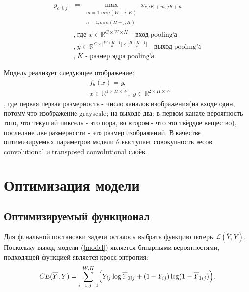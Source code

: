 \documentclass[14pt, a4paper, oneside, bold]{extarticle}
\begin{document}
\begin{equation} \label{pooling}
\begin{aligned}
	y_{c, i, j} & = \max \limits_{
		\substack{
			m=\overline{1, min(W - i, K)}
			\\ n=\overline{1, min(H - j, K)}}}
		x_{c, i K + m, j K + n} \\
	& \text{, где $x \in \mathbb{R}^{C \times W \times H}$ 
		- вход pooling'а} \\
	& \text{, $y \in \mathbb{R}
		^{C 
		  \times \bigl[ \frac{W + K - 1}{K} \bigr] 
		  \times \bigl[ \frac{H + K - 1}{K} \bigr] }$ 
		- выход pooling'а} \\
	& \text{, $K$ - размер ядра pooling'а}.
\end{aligned}
\end{equation}

Модель реализует следующее отображение: 
\begin{equation} \label{model}
\begin{aligned}
	& f_{\theta}(x) = y, \\
	& x \in \mathbb{R}^{1 \times H \times W}
		,\ y \in 
		\mathbb{R}^{2 \times H \times W}
\end{aligned}
\end{equation}
, где первая первая размерность - число каналов изображения(на входе один, потому что изображение grayscale; на выходе два: в первом канале вероятность того, что текущий пиксель - это пора, во втором - что это твёрдое вещество), последние две размерности - это размер изображений. В качестве оптимизируемых параметров модели $\theta$ выступает совокупность весов convolutional и transposed convolutional слоёв.

\newpage


\section{Оптимизация модели}

\subsection{Оптимизируемый функционал}

Для финальной постановки задачи осталось выбрать функцию потерь 
$\mathcal{L}(\overline{Y}, Y)$. Поскольку выход модели (\ref{model})
является бинарными вероятностями, подходящей функцией является кросс-энтропия:
\begin{equation} \label{cross-entropy}
	CE(\overline{Y}, Y) = \sum \limits_{i=1, j=1}^{W, H} \Bigl(
		Y_{ij} \log \overline{Y}_{0ij} 
		+ (1 - Y_{ij}) \log (1 - \overline{Y}_{1ij}) \Bigr).
\end{equation}
\end{document}
